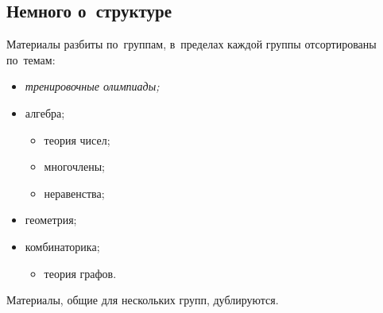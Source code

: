 


\begingroup
\providecommand\ifsourcelinks{\iffalse}
\providecommand\url{\texttt}

\strut

\vfill

\begin{center}
\end{center}

\vfill

\strut

\clearpage




\subsection*{Немного о~структуре}

Материалы разбиты по~группам, в~пределах каждой группы отсортированы по~темам:
\begin{itemize}
    \item \emph{тренировочные олимпиады;}
    \item алгебра;
    \begin{itemize}
        \item теория чисел;
        \item многочлены;
        \item неравенства;
    \end{itemize}
    \item геометрия;
    \item комбинаторика;
    \begin{itemize}
        \item теория графов.
    \end{itemize}
\end{itemize}

Материалы, общие для нескольких групп, дублируются.
\ifsourcelinks
Все материалы сопровождаются ссылками на~исходные файлы \LaTeX.
\fi




\endgroup %

